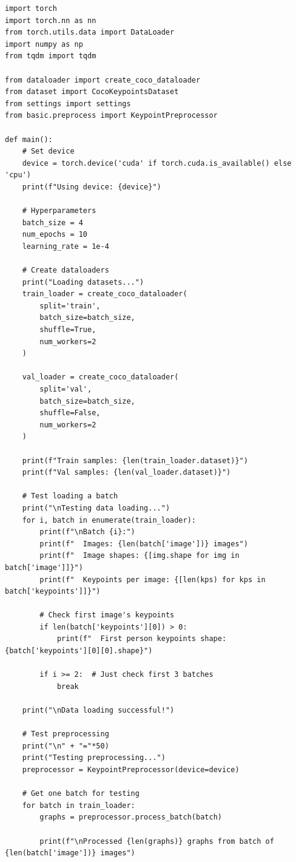 \begin{lstlisting}[style=pythonstyle,title={Preprocessing May Main},label={code:preprocessing_may_main}]
import torch
import torch.nn as nn
from torch.utils.data import DataLoader
import numpy as np
from tqdm import tqdm

from dataloader import create_coco_dataloader
from dataset import CocoKeypointsDataset
from settings import settings
from basic.preprocess import KeypointPreprocessor

def main():
    # Set device
    device = torch.device('cuda' if torch.cuda.is_available() else 'cpu')
    print(f"Using device: {device}")
    
    # Hyperparameters
    batch_size = 4
    num_epochs = 10
    learning_rate = 1e-4
    
    # Create dataloaders
    print("Loading datasets...")
    train_loader = create_coco_dataloader(
        split='train',
        batch_size=batch_size,
        shuffle=True,
        num_workers=2
    )
    
    val_loader = create_coco_dataloader(
        split='val',
        batch_size=batch_size,
        shuffle=False,
        num_workers=2
    )
    
    print(f"Train samples: {len(train_loader.dataset)}")
    print(f"Val samples: {len(val_loader.dataset)}")
    
    # Test loading a batch
    print("\nTesting data loading...")
    for i, batch in enumerate(train_loader):
        print(f"\nBatch {i}:")
        print(f"  Images: {len(batch['image'])} images")
        print(f"  Image shapes: {[img.shape for img in batch['image']]}")
        print(f"  Keypoints per image: {[len(kps) for kps in batch['keypoints']]}")
        
        # Check first image's keypoints
        if len(batch['keypoints'][0]) > 0:
            print(f"  First person keypoints shape: {batch['keypoints'][0][0].shape}")
        
        if i >= 2:  # Just check first 3 batches
            break
    
    print("\nData loading successful!")
    
    # Test preprocessing
    print("\n" + "="*50)
    print("Testing preprocessing...")
    preprocessor = KeypointPreprocessor(device=device)
    
    # Get one batch for testing
    for batch in train_loader:
        graphs = preprocessor.process_batch(batch)
        
        print(f"\nProcessed {len(graphs)} graphs from batch of {len(batch['image'])} images")
        

\end{lstlisting}
